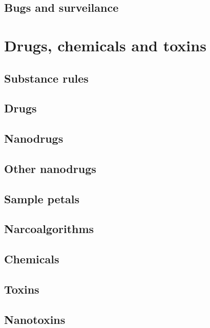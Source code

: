 \subsection{Bugs and surveilance}
\label{sec:bugs-surveilance}

\section{Drugs, chemicals and toxins}
\label{sec:drugs-chemicals-toxins}

\subsection{Substance rules}
\label{sec:substance-rules}

\subsection{Drugs}
\label{sec:drugs}

\subsection{Nanodrugs}
\label{sec:nanodrugs}

\subsection{Other nanodrugs}
\label{sec:other-nanodrugs}

\subsection{Sample petals}
\label{sec:sample-petals}

\subsection{Narcoalgorithms}
\label{sec:narcoalgorithms}

\subsection{Chemicals}
\label{sec:chemicals}

\subsection{Toxins}
\label{sec:toxins}

\subsection{Nanotoxins}
\label{sec:nanotoxins}

